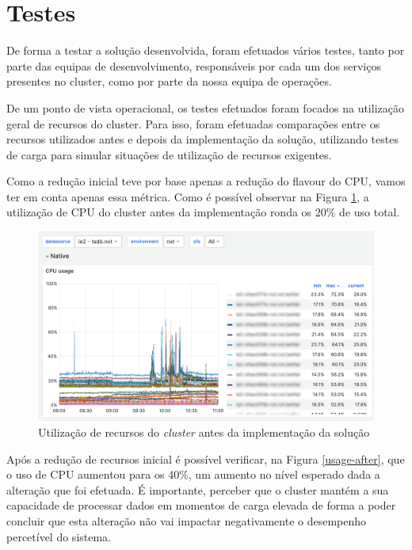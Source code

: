 
\section{Testes}

De forma a testar a solução desenvolvida, foram efetuados vários testes, tanto por parte das
equipas de desenvolvimento, responsáveis por cada um dos serviços presentes no \gls{cluster},
como por parte da nossa equipa de operações. 

De um ponto de vista operacional, os testes efetuados foram focados na utilização geral de
recursos do \gls{cluster}. Para isso, foram efetuadas comparações entre os recursos utilizados
antes e depois da implementação da solução, utilizando testes de carga para simular situações
de utilização de recursos exigentes.

Como a redução inicial teve por base apenas a redução do \gls{flavour} do \ac{CPU}, vamos ter em conta
apenas essa métrica. Como é possível observar na Figura \ref{usage-before}, a utilização de \ac{CPU}
do \gls{cluster} antes da implementação ronda os 20\% de uso total.

\begin{figure}[H]
  \centerline{\includegraphics[scale=0.25]{media/content/impl/grafana-before-1.png}}
  \caption{Utilização de recursos do \textit{cluster} antes da implementação da solução}
  \label{usage-before}
\end{figure}

Após a redução de recursos inicial é possível verificar, na Figura \ref{usage-after}, que o uso 
de CPU aumentou para os 40\%, um aumento no nível esperado dada a alteração que foi efetuada. É 
importante, perceber que o \gls{cluster} mantém a sua capacidade de processar dados em momentos de 
carga elevada de forma a poder concluir que esta alteração não vai impactar negativamente o 
desempenho percetível do sistema. 

